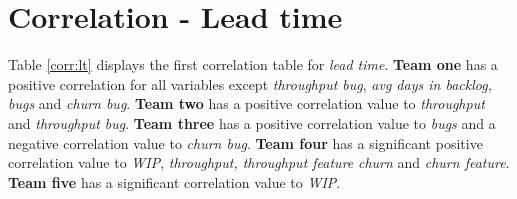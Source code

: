 \documentclass[UKenglish]{ifimaster}  %
\begin{document}
\section{Correlation - Lead time}
\label{sec:corr:lt}
Table \ref{corr:lt} displays the first correlation table for \textit{lead time}. \textbf{Team one} has a positive correlation for all variables except \textit{throughput bug}, \textit{avg days in backlog, bugs} and \textit{churn bug}. \textbf{Team two} has a positive correlation value to \textit{throughput} and \textit{throughput bug}. \textbf{Team three} has a positive correlation value to \textit{bugs} and a negative correlation value to \textit{churn bug}. \textbf{Team four} has a significant positive correlation value to \textit{WIP}, \textit{throughput, throughput feature}  \textit{churn} and \textit{churn feature}. \textbf{Team five} has a significant correlation value to \textit{WIP}.
\end{document}
